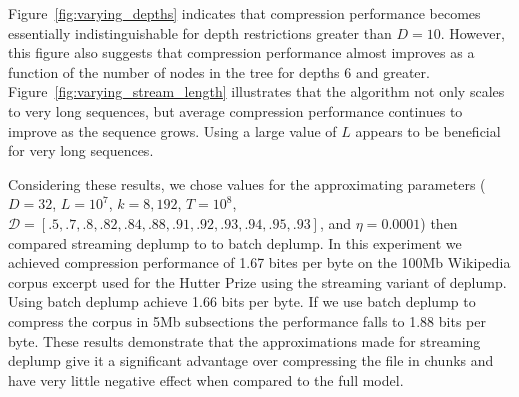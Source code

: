 Figure~\ref{fig:varying_depths} indicates that compression performance becomes essentially indistinguishable for depth restrictions greater than $D=10$.  However, this figure also suggests that compression performance almost improves as a function of the number of nodes in the tree for depths 6 and greater.  Figure~\ref{fig:varying_stream_length} illustrates that the algorithm not only scales to very long sequences, but average compression performance continues to improve as the sequence grows.  Using a large value of $L$ appears to be beneficial for very long sequences.

Considering these results, we chose values for the approximating parameters ($D=32$, $L=10^7$, $k=8,192$, $T=10^8$, $\mathcal{D} = [.5, .7, .8, .82, .84, .88, .91, .92, .93, .94, .95, .93]$, and $\eta=0.0001$) then compared streaming deplump to to batch deplump.  In this experiment we achieved compression performance of 1.67 bites per byte on the 100Mb Wikipedia corpus excerpt used for the Hutter Prize \citep{Hutter2006} using the streaming variant of deplump.  Using batch deplump \citep{Gasthaus2010} achieve 1.66 bits per byte.  If we use batch deplump to compress the corpus in 5Mb subsections the performance falls to 1.88 bits per byte. These results demonstrate that the approximations made for streaming deplump give it a significant advantage over compressing the file in chunks and have very little negative effect when compared to the full model.


